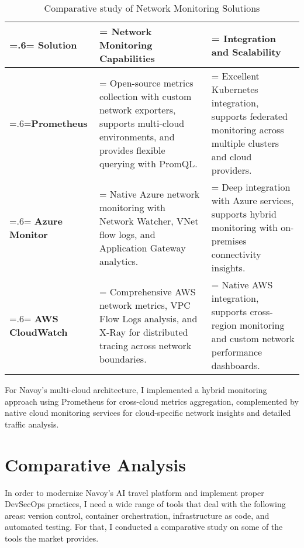 \begin{table}[H]
    \renewcommand{\arraystretch}{1.5}%
    \caption{Comparative study of Network Monitoring Solutions}
    \centering
    \medskip
    \begin{tabularx}{1\textwidth} {
            | >{\hsize=.6\hsize\linewidth=\hsize\centering\arraybackslash}X
            | >{\hsize=1.2\hsize\linewidth=\hsize\justifying\arraybackslash}X
            | >{\hsize=1.2\hsize\linewidth=\hsize\justifying\arraybackslash}X |}
        \hline
        \rowcolor{primary} \textbf {Solution} & \textbf {Network Monitoring Capabilities}                                                                                                              & \textbf {Integration and Scalability}                                                                                   \\
        \hline
        \textbf {Prometheus}                  & \noindent Open-source metrics collection with custom network exporters, supports multi-cloud environments, and provides flexible querying with PromQL. & \noindent Excellent Kubernetes integration, supports federated monitoring across multiple clusters and cloud providers. \\
        \hline
        \textbf {Azure Monitor}               & \noindent Native Azure network monitoring with Network Watcher, VNet flow logs, and Application Gateway analytics.                                     & \noindent Deep integration with Azure services, supports hybrid monitoring with on-premises connectivity insights.      \\
        \hline
        \textbf {AWS CloudWatch}              & \noindent Comprehensive AWS network metrics, VPC Flow Logs analysis, and X-Ray for distributed tracing across network boundaries.                      & \noindent Native AWS integration, supports cross-region monitoring and custom network performance dashboards.           \\
        \hline
    \end{tabularx}
\end{table}

For Navoy's multi-cloud architecture, I implemented a hybrid monitoring approach using Prometheus for cross-cloud metrics aggregation, complemented by native cloud monitoring services for cloud-specific network insights and detailed traffic analysis.

\section{Comparative Analysis}
In order to modernize Navoy's AI travel platform and implement proper DevSecOps practices, I need a wide range of tools that deal with the following areas: version control, container orchestration, infrastructure as code, and automated testing. For that, I conducted a comparative study on some of the tools the market provides.

